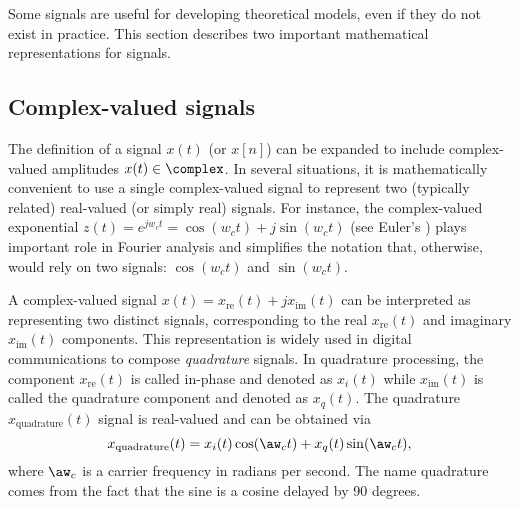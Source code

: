 
Some signals are useful for developing theoretical models, even if they do not exist in practice. 
This section describes two important mathematical representations for signals. 


\subsection{Complex-valued signals}

The definition of a signal $x(t)$ (or $x[n]$) can be expanded to include complex-valued amplitudes $x(t) \in \complex$. In several situations, it is  mathematically convenient to use a single complex-valued signal to represent two (typically related) real-valued (or simply real) signals. 
For instance, the complex-valued exponential $z(t)=e^{j w_c t} = \cos(w_c t) + j \sin(w_c t)$ (see Euler's ) plays important role in Fourier analysis and simplifies the
notation that, otherwise, would rely on two signals: $\cos(w_c t)$ and $\sin(w_c t)$. 

A complex-valued signal $x(t) = x_{\textrm{re}}(t) + j x_{\textrm{im}}(t)$ can be interpreted as representing two distinct signals, corresponding to the real $x_{\textrm{re}}(t)$ and imaginary $x_{\textrm{im}}(t)$ components. This representation is widely used in digital communications to compose 
\emph{quadrature} signals. 
In quadrature processing, the component $x_{\textrm{re}}(t)$ is called in-phase and denoted as \emph{$x_i(t)$} while 
$x_{\textrm{im}}(t)$ is called the quadrature component and denoted as $x_q(t)$.
The quadrature $x_{\textrm{quadrature}}(t)$ signal is real-valued and can be obtained via
\begin{equation}
x_{\textrm{quadrature}}(t) = x_i(t) \cos(\aw_c t) + x_q(t) \sin(\aw_c t),
\label{eq:qam_real_version}
\end{equation}
where $\aw_c$ is a carrier frequency in radians per second.
The name quadrature comes from the fact that the sine is a cosine delayed by 90 degrees.

